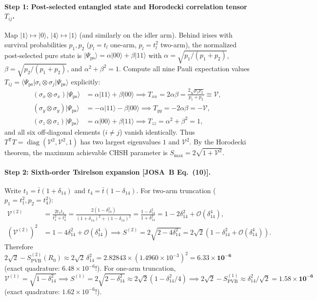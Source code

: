 \documentclass[10pt,letterpaper]{article}
\newcommand{\ket}[1]{\lvert #1 \rangle}
\newcommand{\bra}[1]{\langle #1 \rvert}
\newcommand{\josb}[1]{\textbf{[JOSA~B Eq.~(#1)]}}
\numberwithin{equation}{section}
\begin{document}
\paragraph*{Step 1: Post-selected entangled state and Horodecki correlation tensor $T_{ij}$.}
Map $\ket{1} \mapsto \ket{0}$, $\ket{4} \mapsto \ket{1}$ (and similarly on the idler arm). Behind irises with survival probabilities $p_1, p_2$ ($p_l = t_l$ one-arm, $p_l = t_l^2$ two-arm), the normalized post-selected pure state is $\ket{\Psi_{\mathrm{ps}}} = \alpha\ket{00} + \beta\ket{11}$ with $\alpha = \sqrt{p_1/(p_1+p_2)}$, $\beta = \sqrt{p_2/(p_1+p_2)}$, and $\alpha^2 + \beta^2 = 1$. Compute all nine Pauli expectation values $T_{ij} = \bra{\Psi_{\mathrm{ps}}}\sigma_i\otimes\sigma_j\ket{\Psi_{\mathrm{ps}}}$ explicitly:
\begin{align}
  (\sigma_x\otimes\sigma_x)\ket{\Psi_{\mathrm{ps}}} &= \alpha\ket{11} + \beta\ket{00} \implies T_{xx} = 2\alpha\beta = \frac{2\sqrt{p_1 p_2}}{p_1+p_2} \equiv \mathcal{V}, \\
  (\sigma_y\otimes\sigma_y)\ket{\Psi_{\mathrm{ps}}} &= -\alpha\ket{11} - \beta\ket{00} \implies T_{yy} = -2\alpha\beta = -\mathcal{V}, \\
  (\sigma_z\otimes\sigma_z)\ket{\Psi_{\mathrm{ps}}} &= \alpha\ket{00} + \beta\ket{11} \implies T_{zz} = \alpha^2 + \beta^2 = 1,
\end{align}
and all six off-diagonal elements ($i \neq j$) vanish identically. Thus $T^{\mathsf{T}} T = \operatorname{diag}(\mathcal{V}^2, \mathcal{V}^2, 1)$ has two largest eigenvalues $1$ and $\mathcal{V}^2$. By the Horodecki theorem, the maximum achievable CHSH parameter is $S_{\max} = 2\sqrt{1 + \mathcal{V}^2}$.

\paragraph*{Step 2: Sixth-order Tsirelson expansion \josb{10}.}
Write $t_1 = \bar{t}(1+\delta_{14})$ and $t_4 = \bar{t}(1-\delta_{14})$. For two-arm truncation ($p_1 = t_1^2, p_2 = t_4^2$):
\begin{align}
  \mathcal{V}^{(2)} &= \frac{2 t_1 t_4}{t_1^2 + t_4^2} = \frac{2(1 - \delta_{14}^2)}{(1+\delta_{14})^2 + (1-\delta_{14})^2} = \frac{1 - \delta_{14}^2}{1 + \delta_{14}^2} = 1 - 2\delta_{14}^2 + \mathcal{O}(\delta_{14}^4), \\
  \left(\mathcal{V}^{(2)}\right)^2 &= 1 - 4\delta_{14}^2 + \mathcal{O}(\delta_{14}^4) \implies S^{(2)} = 2\sqrt{2 - 4\delta_{14}^2} = 2\sqrt{2}\left(1 - \delta_{14}^2 + \mathcal{O}(\delta_{14}^4)\right).
\end{align}
Therefore $2\sqrt{2} - S_{\mathrm{PVB}}^{(2)}(R_0) \approx 2\sqrt{2}\,\delta_{14}^2 = 2.82843\times (1.4960\times 10^{-3})^2 = \mathbf{6.33\times 10^{-6}}$ (exact quadrature: $6.48\times 10^{-6}$!). For one-arm truncation, $\mathcal{V}^{(1)} = \sqrt{1 - \delta_{14}^2} \implies S^{(1)} = 2\sqrt{2 - \delta_{14}^2} \approx 2\sqrt{2}(1 - \delta_{14}^2/4) \implies 2\sqrt{2} - S_{\mathrm{PVB}}^{(1)} \approx \delta_{14}^2/\sqrt{2} = \mathbf{1.58\times 10^{-6}}$ (exact quadrature: $1.62\times 10^{-6}$!).
\end{document}
